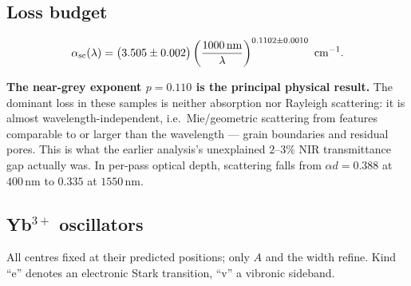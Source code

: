 \documentclass[11pt,a4paper]{article}
\newcommand{\ad}{\alpha d}
\newcommand{\lam}{\lambda}
\begin{document}
\subsection{Loss budget}

\begin{equation}
\alpha_{\rm sc}(\lam)=\bigl(3.505\pm0.002\bigr)
\left(\frac{1000\,\mathrm{nm}}{\lam}\right)^{0.1102\pm0.0010}\ \mathrm{cm}^{-1}.
\end{equation}

\textbf{The near-grey exponent $p=0.110$ is the principal physical result.} The
dominant loss in these samples is neither absorption nor Rayleigh scattering: it
is almost wavelength-independent, i.e.\ Mie/geometric scattering from features
comparable to or larger than the wavelength --- grain boundaries and residual
pores. This is what the earlier analysis's unexplained $2$--$3\%$ NIR
transmittance gap actually was. In per-pass optical depth, scattering falls from
$\ad=0.388$ at $400$\,nm to $0.335$ at $1550$\,nm.

\subsection{Yb$^{3+}$ oscillators}

All centres fixed at their predicted positions; only $A$ and the width refine.
Kind ``e'' denotes an electronic Stark transition, ``v'' a vibronic sideband.
\end{document}

